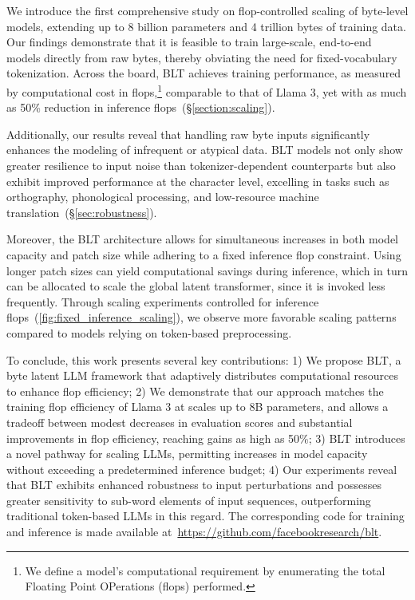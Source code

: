 We introduce the first comprehensive study on flop-controlled scaling of byte-level models, extending up to 8 billion parameters and 4 trillion bytes of training data. Our findings demonstrate that it is feasible to train large-scale, end-to-end models directly from raw bytes, thereby obviating the need for fixed-vocabulary tokenization. Across the board, {\textsc BLT} achieves training performance, as measured by computational cost in flops,\footnote{We define a model's computational requirement by enumerating the total Floating Point OPerations (flops) performed.} comparable to that of Llama 3, yet with as much as 50\% reduction in inference flops~(\S\ref{section:scaling}).

Additionally, our results reveal that handling raw byte inputs significantly enhances the modeling of infrequent or atypical data. {\textsc BLT} models not only show greater resilience to input noise than tokenizer-dependent counterparts but also exhibit improved performance at the character level, excelling in tasks such as orthography, phonological processing, and low-resource machine translation~(\S\ref{sec:robustness}).

Moreover, the {\textsc BLT} architecture allows for simultaneous increases in both model capacity and patch size while adhering to a fixed inference flop constraint. Using longer patch sizes can yield computational savings during inference, which in turn can be allocated to scale the global latent transformer, since it is invoked less frequently. Through scaling experiments controlled for inference flops~(\autoref{fig:fixed_inference_scaling}), we observe more favorable scaling patterns compared to models relying on token-based preprocessing.

To conclude, this work presents several key contributions: 1) We propose {\textsc BLT}, a byte latent LLM framework that adaptively distributes computational resources to enhance flop efficiency; 2) We demonstrate that our approach matches the training flop efficiency of Llama 3 at scales up to 8B parameters, and allows a tradeoff between modest decreases in evaluation scores and substantial improvements in flop efficiency, reaching gains as high as 50\%; 3) {\textsc BLT} introduces a novel pathway for scaling LLMs, permitting increases in model capacity without exceeding a predetermined inference budget; 4) Our experiments reveal that {\textsc BLT} exhibits enhanced robustness to input perturbations and possesses greater sensitivity to sub-word elements of input sequences, outperforming traditional token-based LLMs in this regard. The corresponding code for training and inference is made available at~\url{https://github.com/facebookresearch/blt}.

